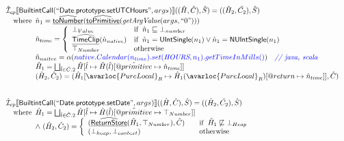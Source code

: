 \[
\begin{array}{l}
\aI _{cp}\lbr \SF{BuiltintCall}(``\SF{Date.prototype.setUTCHours}",args_{})\rbr((\hat{H},\hat{C}), \hat{S})
  = ((\hat{H}_2, \hat{C_2}), \hat{S})\\
\quad\wherec{
  \hat{n}_{1} = \ahf{toNumber}(\ahf{toPrimitive}(\hf{getArgValue}(args, ``0")))\\
  \hat{n}_{time} = \left\{\begin{array}{ll}
      \bot_{Value} & \ifc{\hat{n}_{1} \sqsubseteq  \bot_{number}}\\
      \ahf{TimeClip}(\hat{n}_{native})
      & \ifc{\hat{n}_{1} = \SF{UIntSingle}(n_{1}) \lor \hat{n}_{1} = \SF{NUIntSingle}(n_{1}) }\\
      \top_{Number} & \owc
    \end{array}\right.\\
  \hat{n}_{naitve} = \alpha({\inblue native.Calendar(n_{time}).set(\emph{HOURS}, n_{1}).getTimeInMills()})
    \quad\comment{{\inblue // java, scala}}\\  
  \hat{H}_1 = \bigsqcup_{\hat{l} \in \hat{C}.2} \hat{H}[\hat{l}
    \mapsto \hat{H}(\hat{l})[\avarprop{primitive} \mapsto \hat{n}_{time}]]\\
  (\hat{H}_2, \hat{C}_2) = 
    (\hat{H}_1[\avarloc{PureLocal}_R \mapsto \hat{H}_1(\avarloc{PureLocal}_R)
      [\varprop{return} \mapsto \hat{n}_{time}]], \hat{C})\\
  }\\
\\\\

\aI _{cp}\lbr \SF{BuiltintCall}(``\SF{Date.prototype.setDate}",args_{})\rbr((\hat{H},\hat{C}), \hat{S})
  = ((\hat{H}_2, \hat{C_2}), \hat{S})\\
\quad\wherec{
  \hat{H}_1 = \bigsqcup_{\hat{l} \in \hat{C}.2} \hat{H}[\hat{l}
    \mapsto \hat{H}(\hat{l})[\avarprop{primitive} \mapsto \top_{Number}]]\\
  \land\ (\hat{H}_2, \hat{C}_2) = 
    \left\{\begin{array}{l@{\quad\quad}l}
      (\ahf{ReturnStore}(\hat{H}_1, \top_{Number}), \hat{C})
      & \ifc{\hat{H}_1 \not\sqsubseteq \bot_{Heap}}\\
      (\bot_{heap}, \bot_{context}) & \owc \\
    \end{array}\right.\\
  }\\
\\\\



\end{array}\]
